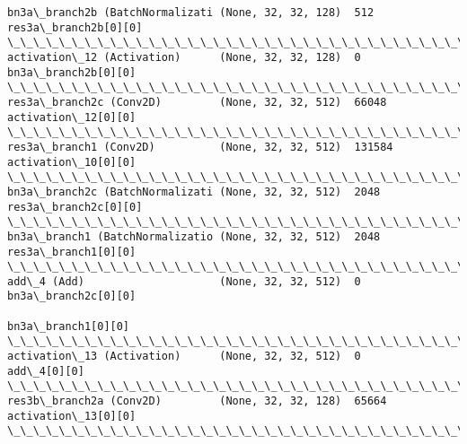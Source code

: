 \documentclass[11pt]{article}
\begin{document}
\begin{Verbatim}[commandchars=\\\{\}]
bn3a\_branch2b (BatchNormalizati (None, 32, 32, 128)  512         res3a\_branch2b[0][0]             
\_\_\_\_\_\_\_\_\_\_\_\_\_\_\_\_\_\_\_\_\_\_\_\_\_\_\_\_\_\_\_\_\_\_\_\_\_\_\_\_\_\_\_\_\_\_\_\_\_\_\_\_\_\_\_\_\_\_\_\_\_\_\_\_\_\_\_\_\_\_\_\_\_\_\_\_\_\_\_\_\_\_\_\_\_\_\_\_\_\_\_\_\_\_\_\_\_\_
activation\_12 (Activation)      (None, 32, 32, 128)  0           bn3a\_branch2b[0][0]              
\_\_\_\_\_\_\_\_\_\_\_\_\_\_\_\_\_\_\_\_\_\_\_\_\_\_\_\_\_\_\_\_\_\_\_\_\_\_\_\_\_\_\_\_\_\_\_\_\_\_\_\_\_\_\_\_\_\_\_\_\_\_\_\_\_\_\_\_\_\_\_\_\_\_\_\_\_\_\_\_\_\_\_\_\_\_\_\_\_\_\_\_\_\_\_\_\_\_
res3a\_branch2c (Conv2D)         (None, 32, 32, 512)  66048       activation\_12[0][0]              
\_\_\_\_\_\_\_\_\_\_\_\_\_\_\_\_\_\_\_\_\_\_\_\_\_\_\_\_\_\_\_\_\_\_\_\_\_\_\_\_\_\_\_\_\_\_\_\_\_\_\_\_\_\_\_\_\_\_\_\_\_\_\_\_\_\_\_\_\_\_\_\_\_\_\_\_\_\_\_\_\_\_\_\_\_\_\_\_\_\_\_\_\_\_\_\_\_\_
res3a\_branch1 (Conv2D)          (None, 32, 32, 512)  131584      activation\_10[0][0]              
\_\_\_\_\_\_\_\_\_\_\_\_\_\_\_\_\_\_\_\_\_\_\_\_\_\_\_\_\_\_\_\_\_\_\_\_\_\_\_\_\_\_\_\_\_\_\_\_\_\_\_\_\_\_\_\_\_\_\_\_\_\_\_\_\_\_\_\_\_\_\_\_\_\_\_\_\_\_\_\_\_\_\_\_\_\_\_\_\_\_\_\_\_\_\_\_\_\_
bn3a\_branch2c (BatchNormalizati (None, 32, 32, 512)  2048        res3a\_branch2c[0][0]             
\_\_\_\_\_\_\_\_\_\_\_\_\_\_\_\_\_\_\_\_\_\_\_\_\_\_\_\_\_\_\_\_\_\_\_\_\_\_\_\_\_\_\_\_\_\_\_\_\_\_\_\_\_\_\_\_\_\_\_\_\_\_\_\_\_\_\_\_\_\_\_\_\_\_\_\_\_\_\_\_\_\_\_\_\_\_\_\_\_\_\_\_\_\_\_\_\_\_
bn3a\_branch1 (BatchNormalizatio (None, 32, 32, 512)  2048        res3a\_branch1[0][0]              
\_\_\_\_\_\_\_\_\_\_\_\_\_\_\_\_\_\_\_\_\_\_\_\_\_\_\_\_\_\_\_\_\_\_\_\_\_\_\_\_\_\_\_\_\_\_\_\_\_\_\_\_\_\_\_\_\_\_\_\_\_\_\_\_\_\_\_\_\_\_\_\_\_\_\_\_\_\_\_\_\_\_\_\_\_\_\_\_\_\_\_\_\_\_\_\_\_\_
add\_4 (Add)                     (None, 32, 32, 512)  0           bn3a\_branch2c[0][0]              
                                                                 bn3a\_branch1[0][0]               
\_\_\_\_\_\_\_\_\_\_\_\_\_\_\_\_\_\_\_\_\_\_\_\_\_\_\_\_\_\_\_\_\_\_\_\_\_\_\_\_\_\_\_\_\_\_\_\_\_\_\_\_\_\_\_\_\_\_\_\_\_\_\_\_\_\_\_\_\_\_\_\_\_\_\_\_\_\_\_\_\_\_\_\_\_\_\_\_\_\_\_\_\_\_\_\_\_\_
activation\_13 (Activation)      (None, 32, 32, 512)  0           add\_4[0][0]                      
\_\_\_\_\_\_\_\_\_\_\_\_\_\_\_\_\_\_\_\_\_\_\_\_\_\_\_\_\_\_\_\_\_\_\_\_\_\_\_\_\_\_\_\_\_\_\_\_\_\_\_\_\_\_\_\_\_\_\_\_\_\_\_\_\_\_\_\_\_\_\_\_\_\_\_\_\_\_\_\_\_\_\_\_\_\_\_\_\_\_\_\_\_\_\_\_\_\_
res3b\_branch2a (Conv2D)         (None, 32, 32, 128)  65664       activation\_13[0][0]              
\_\_\_\_\_\_\_\_\_\_\_\_\_\_\_\_\_\_\_\_\_\_\_\_\_\_\_\_\_\_\_\_\_\_\_\_\_\_\_\_\_\_\_\_\_\_\_\_\_\_\_\_\_\_\_\_\_\_\_\_\_\_\_\_\_\_\_\_\_\_\_\_\_\_\_\_\_\_\_\_\_\_\_\_\_\_\_\_\_\_\_\_\_\_\_\_\_\_

\end{Verbatim}
\end{document}
